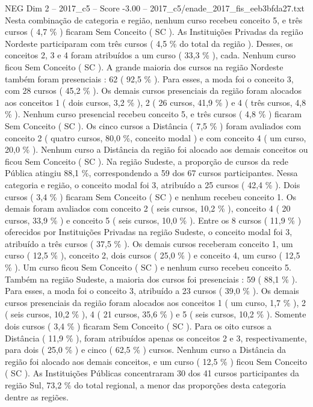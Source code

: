 \begin{textsample}{NEG Dim 2 – 2017\_c5 – Score -3.00 – 2017\_c5/enade\_2017\_fis\_eeb3bfda27.txt}
Nesta combinação de categoria e região, nenhum curso recebeu conceito 5, e três cursos ( 4,7 \% ) ficaram Sem Conceito ( SC ).
As Instituições Privadas da região Nordeste participaram com três cursos ( 4,5 \% do total da região ).
Desses, os conceitos 2, 3 e 4 foram atribuídos a um curso ( 33,3 \% ), cada.
Nenhum curso ficou Sem Conceito ( SC ).
A grande maioria dos cursos na região Nordeste também foram presenciais : 62 ( 92,5 \% ).
Para esses, a moda foi o conceito 3, com 28 cursos ( 45,2 \% ).
Os demais cursos presenciais da região foram alocados aos conceitos 1 ( dois cursos, 3,2 \% ), 2 ( 26 cursos, 41,9 \% ) e 4 ( três cursos, 4,8 \% ).
Nenhum curso presencial recebeu conceito 5, e três cursos ( 4,8 \% ) ficaram Sem Conceito ( SC ).
Os cinco cursos a Distância ( 7,5 \% ) foram avaliados com conceito 2 ( quatro cursos, 80,0 \%, conceito modal ) e com conceito 4 ( um curso, 20,0 \% ).
Nenhum curso a Distância da região foi alocado aos demais conceitos ou ficou Sem Conceito ( SC ).
Na região Sudeste, a proporção de cursos da rede Pública atingiu 88,1 \%, correspondendo a 59 dos 67 cursos participantes.
Nessa categoria e região, o conceito modal foi 3, atribuído a 25 cursos ( 42,4 \% ).
Dois cursos ( 3,4 \% ) ficaram Sem Conceito ( SC ) e nenhum recebeu conceito 1.
Os demais foram avaliados com conceito 2 ( seis cursos, 10,2 \% ), conceito 4 ( 20 cursos, 33,9 \% ) e conceito 5 ( seis cursos, 10,0 \% ).
Entre os 8 cursos ( 11,9 \% ) oferecidos por Instituições Privadas na região Sudeste, o conceito modal foi 3, atribuído a três cursos ( 37,5 \% ).
Os demais cursos receberam conceito 1, um curso ( 12,5 \% ), conceito 2, dois cursos ( 25,0 \% ) e conceito 4, um curso ( 12,5 \% ).
Um curso ficou Sem Conceito ( SC ) e nenhum curso recebeu conceito 5.
Também na região Sudeste, a maioria dos cursos foi presenciais : 59 ( 88,1 \% ).
Para esses, a moda foi o conceito 3, atribuído a 23 cursos ( 39,0 \% ).
Os demais cursos presenciais da região foram alocados aos conceitos 1 ( um curso, 1,7 \% ), 2 ( seis cursos, 10,2 \% ), 4 ( 21 cursos, 35,6 \% ) e 5 ( seis cursos, 10,2 \% ).
Somente dois cursos ( 3,4 \% ) ficaram Sem Conceito ( SC ).
Para os oito cursos a Distância ( 11,9 \% ), foram atribuídos apenas os conceitos 2 e 3, respectivamente, para dois ( 25,0 \% ) e cinco ( 62,5 \% ) cursos.
Nenhum curso a Distância da região foi alocado aos demais conceitos, e um curso ( 12,5 \% ) ficou Sem Conceito ( SC ).
As Instituições Públicas concentraram 30 dos 41 cursos participantes da região Sul, 73,2 \% do total regional, a menor das proporções desta categoria dentre as regiões.

\end{textsample}
